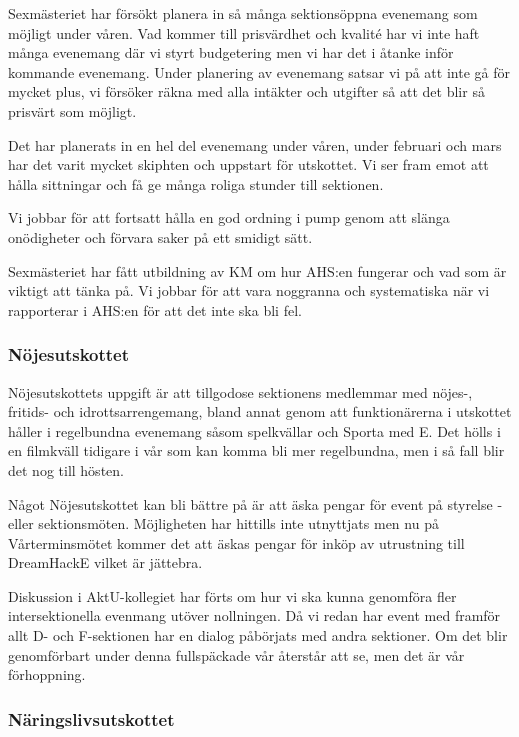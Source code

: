 \documentclass[../_main/handlingar.tex]{subfiles}
\begin{document}
Sexmästeriet har försökt planera in så många sektionsöppna evenemang som möjligt under våren. Vad kommer till prisvärdhet och kvalité har vi inte haft många evenemang där vi styrt budgetering men vi har det i åtanke inför kommande evenemang. Under planering av evenemang satsar vi på att inte gå för mycket plus, vi försöker räkna med alla intäkter och utgifter så att det blir så prisvärt som möjligt. 

Det har planerats in en hel del evenemang under våren, under februari och mars har det varit mycket skiphten och uppstart för utskottet. Vi ser fram emot att hålla sittningar och få ge många roliga stunder till sektionen.

Vi jobbar för att fortsatt hålla en god ordning i pump genom att slänga onödigheter och förvara saker på ett smidigt sätt.

Sexmästeriet har fått utbildning av KM om hur AHS:en fungerar och vad som är viktigt att tänka på. Vi jobbar för att vara noggranna och systematiska när vi rapporterar i AHS:en för att det inte ska bli fel. 

\subsubsection*{Nöjesutskottet}

Nöjesutskottets uppgift är att tillgodose sektionens medlemmar med nöjes-, fritids- och idrottsarrengemang, bland annat genom att funktionärerna i utskottet håller i regelbundna evenemang såsom spelkvällar och Sporta med E. Det hölls i en filmkväll tidigare i vår som kan komma bli mer regelbundna, men i så fall blir det nog till hösten. 

Något Nöjesutskottet kan bli bättre på är att äska pengar för event på styrelse -eller sektionsmöten. Möjligheten har hittills inte utnyttjats men nu på Vårterminsmötet kommer det att äskas pengar för inköp av utrustning till DreamHackE vilket är jättebra. 

Diskussion i AktU-kollegiet har förts om hur vi ska kunna genomföra fler intersektionella evenmang utöver nollningen. Då vi redan har event med framför allt D- och F-sektionen har en dialog påbörjats med andra sektioner. Om det blir genomförbart under denna fullspäckade vår återstår att se, men det är vår förhoppning. 

\subsubsection*{Näringslivsutskottet}
\end{document}

